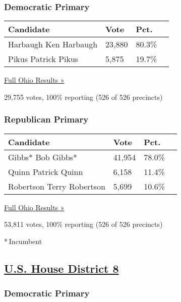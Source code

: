 \hypertarget{democratic-primary-8}{%
\subsubsection{Democratic Primary}\label{democratic-primary-8}}

\begin{longtable}[]{@{}llll@{}}
\toprule
Candidate & Vote & Pct. &\tabularnewline
\midrule
\endhead
 Harbaugh Ken Harbaugh & 23,880 & 80.3\% &\tabularnewline
 Pikus Patrick Pikus & 5,875 & 19.7\% &\tabularnewline
\bottomrule
\end{longtable}

\href{https://www.nytimes3xbfgragh.onion/elections/results/ohio}{Full
Ohio Results »}

29,755 votes, 100\% reporting (526 of 526 precincts)

\hypertarget{republican-primary-8}{%
\subsubsection{Republican Primary}\label{republican-primary-8}}

\begin{longtable}[]{@{}llll@{}}
\toprule
Candidate & Vote & Pct. &\tabularnewline
\midrule
\endhead
 Gibbs* Bob Gibbs* & 41,954 & 78.0\% &\tabularnewline
 Quinn Patrick Quinn & 6,158 & 11.4\% &\tabularnewline
 Robertson Terry Robertson & 5,699 & 10.6\% &\tabularnewline
\bottomrule
\end{longtable}

\href{https://www.nytimes3xbfgragh.onion/elections/results/ohio}{Full
Ohio Results »}

53,811 votes, 100\% reporting (526 of 526 precincts)

* Incumbent

\hypertarget{us-house-district-8}{%
\subsection{\texorpdfstring{\href{https://www.nytimes3xbfgragh.onion/elections/results/ohio-house-district-8-primary-election}{U.S.
House District 8}}{U.S. House District 8}}\label{us-house-district-8}}

\hypertarget{democratic-primary-9}{%
\subsubsection{Democratic Primary}\label{democratic-primary-9}}

